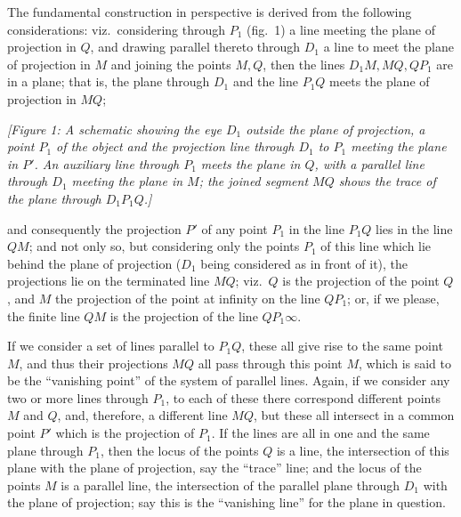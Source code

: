 \documentclass[11pt]{article}
\begin{document}
The fundamental construction in perspective is derived from the following considerations:
viz.\ considering through $P_{1}$ (fig.\ 1) a line meeting the plane of projection in
$Q$, and drawing parallel thereto through $D_{1}$ a line to meet the plane of projection
in $M$ and joining the points $M,Q$, then the lines $D_{1}M,MQ,QP_{1}$ are in a plane;
that is, the plane through $D_{1}$ and the line $P_{1}Q$ meets the plane of projection
in $MQ$;

\medskip
\textit{[Figure 1: A schematic showing the eye $D_{1}$ outside the plane of projection,
a point $P_{1}$ of the object and the projection line through $D_{1}$ to $P_{1}$ meeting
the plane in $P'$. An auxiliary line through $P_{1}$ meets the plane in $Q$, with a
parallel line through $D_{1}$ meeting the plane in $M$; the joined segment $MQ$ shows the
trace of the plane through $D_{1}P_{1}Q$.]}
\medskip

and consequently the projection $P'$ of any point $P_{1}$ in the line $P_{1}Q$ lies in
the line $QM$; and not only so, but considering only the points $P_{1}$ of this line
which lie behind the plane of projection ($D_{1}$ being considered as in front of it),
the projections lie on the terminated line $MQ$; viz.\ $Q$ is the projection of the
point $Q$, and $M$ the projection of the point at infinity on the line $QP_{1}$; or, if
we please, the finite line $QM$ is the projection of the line $QP_{1}\infty$.

If we consider a set of lines parallel to $P_{1}Q$, these all give rise to the same
point $M$, and thus their projections $MQ$ all pass through this point $M$, which is
said to be the ``vanishing point'' of the system of parallel lines. Again, if we
consider any two or more lines through $P_{1}$, to each of these there correspond
different points $M$ and $Q$, and, therefore, a different line $MQ$, but these all
intersect in a common point $P'$ which is the projection of $P_{1}$. If the lines are
all in one and the same plane through $P_{1}$, then the locus of the points $Q$ is a
line, the intersection of this plane with the plane of projection, say the ``trace''
line; and the locus of the points $M$ is a parallel line, the intersection of the
parallel plane through $D_{1}$ with the plane of projection; say this is the
``vanishing line'' for the plane in question.
\end{document}
